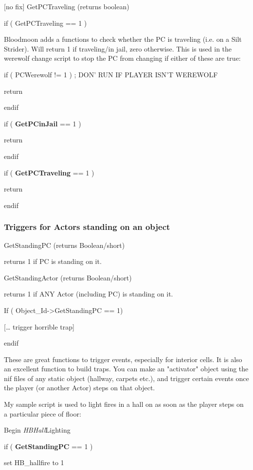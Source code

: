 \documentclass[
]{article}
\begin{document}
{[}no fix{]} GetPCTraveling (returns boolean)

if ( GetPCTraveling == 1 )

Bloodmoon adds a functions to check whether the PC is traveling (i.e. on
a Silt Strider). Will return 1 if traveling/in jail, zero otherwise.
This is used in the werewolf change script to stop the PC from changing
if either of these are true:

if ( PCWerewolf != 1 ) ; DON' RUN IF PLAYER ISN'T WEREWOLF

return

endif

if ( \textbf{GetPCinJail} == 1 )

return

endif

if ( \textbf{GetPCTraveling} == 1 )

return

endif

\hypertarget{triggers-for-actors-standing-on-an-object}{%
\subsubsection{Triggers for Actors standing on an
object}\label{triggers-for-actors-standing-on-an-object}}

GetStandingPC (returns Boolean/short)

returns 1 if PC is standing on it.

GetStandingActor (returns Boolean/short)

returns 1 if ANY Actor (including PC) is standing on it.

If ( Object\_Id-\textgreater GetStandingPC == 1)

{[}\ldots{} trigger horrible trap{]}

endif

These are great functions to trigger events, especially for interior
cells. It is also an excellent function to build traps. You can make an
"activator" object using the nif files of any static object (hallway,
carpets etc.), and trigger certain events once the player (or another
Actor) steps on that object.

My sample script is used to light fires in a hall on as soon as the
player steps on a particular piece of floor:

Begin \emph{HBHall}Lighting

if ( \textbf{GetStandingPC} == 1 )

set HB\_hallfire to 1
\end{document}
